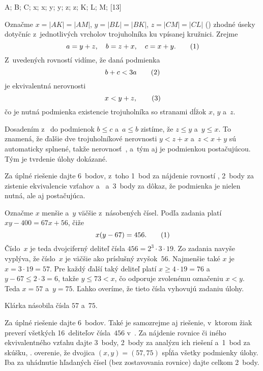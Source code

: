 {%
\fontplace
\tpoint A; \tpoint B; \bpoint C;
\tpoint x; \rBpoint x; \tpoint y; \lBpoint y; \lBpoint z; \rBpoint z;
\tpoint K; \lBpoint L; \rBpoint M;
[13] \hfil\Obr\strut

Označme $x=|AK|=|AM|$, $y=|BL|=|BK|$, $z=|CM|=|CL|$ (\obr)
\inspicture{}
zhodné úseky dotyčníc
z~jednotlivých vrcholov trojuholníka ku vpísanej kružnici. Zrejme
$$
  a = y+z,\quad b = z+x,\quad c = x+y. \tag1
$$
Z~uvedených rovností vidíme, že daná podmienka
$$
  b+c < 3a \tag2
$$
je ekvivalentná nerovnosti
$$
  x < y+z, \tag3
$$
čo je nutná podmienka existencie trojuholníka
so stranami dĺžok $x$, $y$ a~$z$.

Dosadením z~ do podmienok $b\le c$ a~$a\le b$ zistíme, že $z\le y$
a~$y\le x$. To znamená, že ďalšie dve trojuholníkové nerovnosti $y<z+x$ a~$z<x+y$
sú automaticky splnené, takže nerovnosť~, a~tým aj  je
podmienkou postačujúcou. Tým je tvrdenie úlohy dokázané.

\nobreak\medskip\petit\noindent
Za úplné riešenie dajte 6~bodov, z~toho 1~bod za nájdenie rovností , 2~body za
zistenie ekvivalencie vzťahov  a~ a~3~body za dôkaz,
že podmienka  je nielen nutná, ale
aj postačujúca.
\endpetit
\bigbreak}

{%
Označme $x$ menšie a~$y$ väčšie z~násobených čísel. Podľa zadania platí
$xy-400=67x+56$,
čiže
$$
x(y-67) = 456.  \tag1
$$
Číslo~$x$ je teda dvojciferný deliteľ čísla $456=2^3\cdot3\cdot19$.
Zo zadania navyše vyplýva, že číslo~$x$ je väčšie ako príslušný zvyšok~$56$.
Najmenšie také $x$ je $x=3\cdot19=57$. Pre každý ďalší taký deliteľ
platí $x\ge4\cdot19=76$ a~$y-67\le2\cdot3=6$, takže $y\le73<x$,
čo odporuje zvolenému označeniu $x<y$. Teda $x=57$ a~$y=75$.
Ľahko overíme, že tieto čísla vyhovujú zadaniu úlohy.

\zaver
Klárka násobila čísla $57$ a~$75$.




\nobreak\medskip\petit\noindent
Za úplné riešenie dajte 6~bodov. Také je samozrejme aj riešenie, v~ktorom žiak preverí
všetkých 16~deliteľov čísla~$456$ v~.
Za nájdenie rovnice  či iného ekvivalentného vzťahu dajte 3~body,
2~body za analýzu ich riešení a~1~bod za skúšku, \tj. overenie,
že dvojica $(x,y)=(57,75)$ spĺňa všetky
podmienky úlohy. Iba za uhádnutie hľadaných čísel (bez zostavovania rovnice)
dajte celkom 2~body.
\endpetit
\bigbreak}

